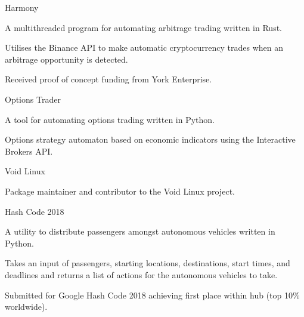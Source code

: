 
\begin{cventries}
  \cventry
    {} %
    {Harmony} %
    {} %
    {} %
    {
      \begin{cvitems} %
        \item {A multithreaded program for automating arbitrage trading written in Rust.}
        \vspace{0.5mm}
		\item {Utilises the Binance API to make automatic cryptocurrency trades when an arbitrage opportunity is detected.}
		\vspace{0.5mm}
		\item {Received proof of concept funding from York Enterprise.}
      \end{cvitems}
    }

  \cventry
    {} %
    {Options Trader} %
    {} %
    {} %
    {
      \begin{cvitems} %
        \item {A tool for automating options trading written in Python.}
        \vspace{0.5mm}
		\item {Options strategy automaton based on economic indicators using the Interactive Brokers API.}
      \end{cvitems}
    }

  \cventry
    {} %
    {Void Linux} %
    {} %
    {} %
    {
      \begin{cvitems} %
      	\item {Package maintainer and contributor to the Void Linux project.}
      \end{cvitems}
    }

  \cventry
    {} %
    {Hash Code 2018} %
    {} %
    {} %
    {
      \begin{cvitems} %
      	\item {A utility to distribute passengers amongst autonomous vehicles written in Python.}
      	\vspace{0.5mm}
		\item {Takes an input of passengers, starting locations, destinations, start times, and deadlines and returns a list of actions for the autonomous vehicles to take.}
		\vspace{0.5mm}
		\item {Submitted for Google Hash Code 2018 achieving first place within hub (top 10\% worldwide).}
      \end{cvitems}
    }
\end{cventries}
